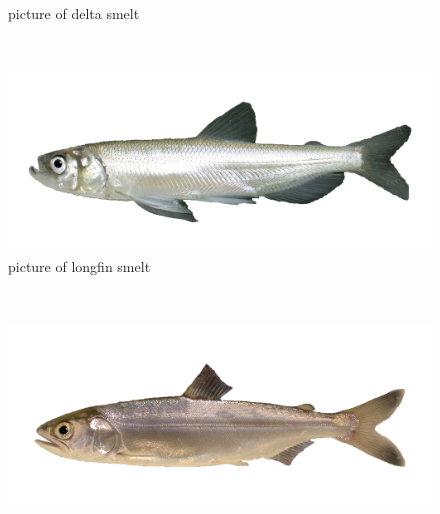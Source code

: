 \documentclass[
]{book}
\begin{document}
\begin{panel-grid}
\begin{columns-nocenter}
\begin{column800}
\begin{figure}
{}

\caption{picture of delta smelt}\label{fig:unnamed-chunk-179}
\end{figure}

\end{column800}

\begin{column40}

~

\end{column40}

\begin{column800}

\begin{figure}

{\centering \includegraphics[width=29.17in]{figures/longfin_smelt_adult} 

}

\caption{picture of longfin smelt}\label{fig:unnamed-chunk-180}
\end{figure}

\end{column800}

\begin{column40}

~

\end{column40}

\begin{column800}

\begin{figure}

{\centering \includegraphics[width=29.17in]{figures/chinook_salmon_smolt} 

}
\end{figure}
\end{column800}
\end{columns-nocenter}
\end{panel-grid}
\end{document}
